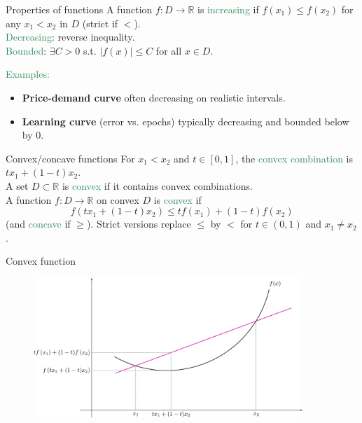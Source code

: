 \documentclass[11pt,aspectratio=169]{beamer}
\begin{document}
\begin{frame}{Properties of functions}
A function $f:D \rightarrow \mathbb{R}$ is \textcolor{SeaGreen}{increasing} if 
$f(x_1)\le f(x_2)$ for any $x_1<x_2$ in $D$ (strict if $<$).\\[6pt]
\textcolor{SeaGreen}{Decreasing}: reverse inequality.\\[6pt]
\textcolor{SeaGreen}{Bounded}: $\exists C>0$ s.t. $|f(x)|\le C$ for all $x\in D$. 
\bigskip

\textcolor{SeaGreen}{Examples:}
\begin{itemize}
\item \textbf{Price-demand curve} often decreasing on realistic intervals.
\item \textbf{Learning curve} (error vs. epochs) typically decreasing and bounded below by $0$.
\end{itemize}
\end{frame}



\begin{frame}{Convex/concave functions}
For $x_1<x_2$ and $t\in[0,1]$, the \textcolor{SeaGreen}{convex combination} is $tx_1+(1-t)x_2$.\\[4pt]
A set $D\subset\mathbb{R}$ is \textcolor{SeaGreen}{convex} if it contains convex combinations.\\[6pt]
A function $f:D\to\mathbb{R}$ on convex $D$ is \textcolor{SeaGreen}{convex} if
\[
f(tx_1+(1-t)x_2)\le tf(x_1)+(1-t)f(x_2)
\]
(and \textcolor{SeaGreen}{concave} if $\ge$). Strict versions replace $\le$ by $<$ for $t\in(0,1)$ and $x_1\ne x_2$.
\end{frame}

\begin{frame}{Convex function}
\begin{figure}
\includegraphics[width=4in]{img/convex} 
\end{figure}
\end{frame}
\end{document}
